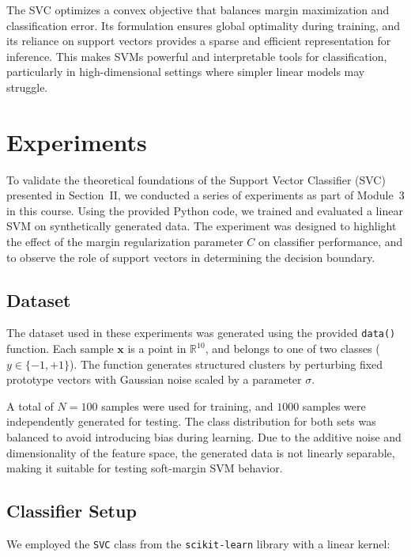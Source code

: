 \documentclass[conference]{IEEEtran}
\begin{document}
	The SVC optimizes a convex objective that balances margin maximization and classification error. Its formulation ensures global optimality during training, and its reliance on support vectors provides a sparse and efficient representation for inference. This makes SVMs powerful and interpretable tools for classification, particularly in high-dimensional settings where simpler linear models may struggle.

	
	\section{Experiments}
	
	To validate the theoretical foundations of the Support Vector Classifier (SVC) presented in Section~II, we conducted a series of experiments as part of Module~3 in this course. Using the provided Python code, we trained and evaluated a linear SVM on synthetically generated data. The experiment was designed to highlight the effect of the margin regularization parameter $C$ on classifier performance, and to observe the role of support vectors in determining the decision boundary.
	
	\subsection{Dataset}
	
	The dataset used in these experiments was generated using the provided \texttt{data()} function. Each sample $\mathbf{x}$ is a point in $\mathbb{R}^{10}$, and belongs to one of two classes ($y \in \{-1, +1\}$). The function generates structured clusters by perturbing fixed prototype vectors with Gaussian noise scaled by a parameter $\sigma$.
	
	A total of $N = 100$ samples were used for training, and $1000$ samples were independently generated for testing. The class distribution for both sets was balanced to avoid introducing bias during learning. Due to the additive noise and dimensionality of the feature space, the generated data is not linearly separable, making it suitable for testing soft-margin SVM behavior.
	
	\subsection{Classifier Setup}
	
	We employed the \texttt{SVC} class from the \texttt{scikit-learn} library with a linear kernel:
	
\end{document}
